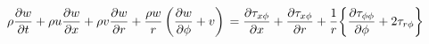 \begin{equation}
\rho\pdv{w}{t} 
  + \rho u\pdv{w}{x} 
  + \rho v\pdv{w}{r} 
  + \frac{\rho w}{r}
  \left(\pdv{w}{\phi} + v\right) \\
= \pdv{\tau_{x\phi}}{x} + \pdv{\tau_{x\phi}}{r} 
  + \frac{1}{r}\bigg\{\pdv{\tau_{\phi\phi}}{\phi} + 2 \tau_{r\phi} \bigg\}
\end{equation}
